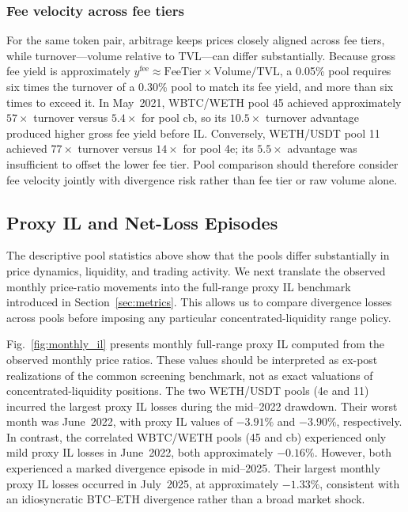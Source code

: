 \documentclass[10pt,conference,compsocconf]{IEEEtran}
\begin{document}
\subsubsection{Fee velocity across fee tiers}
For the same token pair, arbitrage keeps prices closely aligned across fee tiers, while turnover---volume relative to TVL---can differ substantially.
Because gross fee yield is approximately $y^{\mathrm{fee}}\approx\mathrm{FeeTier}\times\mathrm{Volume}/\mathrm{TVL}$, a 0.05\% pool requires six times the turnover of a 0.30\% pool to match its fee yield, and more than six times to exceed it. In May~2021, WBTC/WETH pool 45 achieved approximately $57\times$ turnover versus $5.4\times$ for pool cb, so its $10.5\times$ turnover advantage produced higher gross fee yield before IL. Conversely, WETH/USDT pool 11 achieved $77\times$ turnover versus $14\times$ for pool 4e; its $5.5\times$ advantage was insufficient to offset the lower fee tier. Pool comparison should therefore consider fee velocity jointly with divergence risk rather than fee tier or raw volume alone.

\subsection{Proxy IL and Net-Loss Episodes}

The descriptive pool statistics above show that the pools differ substantially in price dynamics, liquidity, and trading activity. We next translate the observed monthly price-ratio movements into the full-range proxy IL benchmark introduced in Section~\ref{sec:metrics}. This allows us to compare divergence losses across pools before imposing any particular concentrated-liquidity range policy.

Fig.~\ref{fig:monthly_il} presents monthly full-range proxy IL computed from the observed monthly price ratios. These values should be interpreted as ex-post realizations of the common screening benchmark, not as exact valuations of concentrated-liquidity positions.
The two WETH/USDT pools (4e and 11) incurred the largest proxy IL losses during the mid--2022 drawdown. Their worst month was June~2022, with proxy IL values of $-3.91\%$ and $-3.90\%$, respectively. In contrast, the correlated WBTC/WETH pools (45 and cb) experienced only mild proxy IL losses in June~2022, both approximately $-0.16\%$. However, both experienced a marked divergence episode in mid--2025. Their largest monthly proxy IL losses occurred in July~2025, at approximately $-1.33\%$, consistent with an idiosyncratic BTC--ETH divergence rather than a broad market shock.
\end{document}
